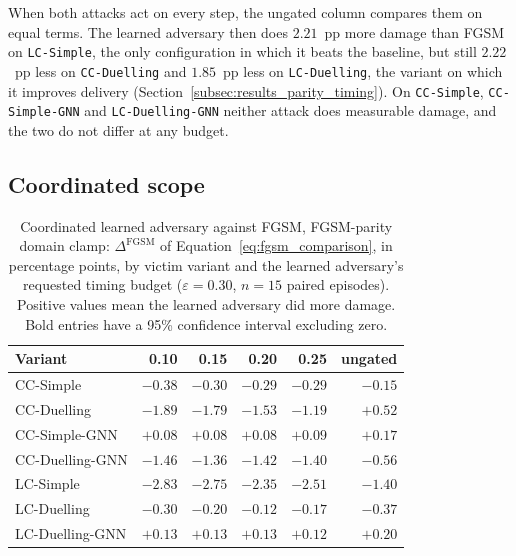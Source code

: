 When both attacks act on every step, the ungated column compares them on equal terms.
The learned adversary then does $2.21$~pp more damage than FGSM on \texttt{LC-Simple},
the only configuration in which it beats the baseline, but still $2.22$~pp less on
\texttt{CC-Duelling} and $1.85$~pp less on \texttt{LC-Duelling}, the variant on which it
improves delivery (Section~\ref{subsec:results_parity_timing}). On \texttt{CC-Simple},
\texttt{CC-Simple-GNN} and \texttt{LC-Duelling-GNN} neither attack does measurable damage,
and the two do not differ at any budget.

\subsection{Coordinated scope}
\label{subsec:results_fgsm_coordinated}

\begin{table}[htbp]
  \centering
  \caption{Coordinated learned adversary against FGSM, FGSM-parity domain clamp:
           $\Delta^{\text{FGSM}}$ of Equation~\eqref{eq:fgsm_comparison}, in percentage
           points, by victim variant and the learned adversary's requested timing budget
           ($\varepsilon = 0.30$, $n = 15$ paired episodes). Positive values mean the
           learned adversary did more damage. Bold entries have a 95\% confidence
           interval excluding zero.}
  \label{tab:fgsm_vs_coordinated}
  \begin{tabular}{lrrrrr}
    \hline
    \textbf{Variant} & \textbf{0.10} & \textbf{0.15} & \textbf{0.20} & \textbf{0.25} & \textbf{ungated} \\
    \hline
    CC-Simple        & $-0.38$ & $-0.30$ & $-0.29$ & $-0.29$ & $-0.15$ \\
    CC-Duelling      & $\mathbf{-1.89}$ & $\mathbf{-1.79}$ & $-1.53$ & $-1.19$ & $+0.52$ \\
    CC-Simple-GNN    & $+0.08$ & $+0.08$ & $+0.08$ & $+0.09$ & $+0.17$ \\
    CC-Duelling-GNN  & $\mathbf{-1.46}$ & $-1.36$ & $\mathbf{-1.42}$ & $\mathbf{-1.40}$ & $-0.56$ \\
    LC-Simple        & $\mathbf{-2.83}$ & $\mathbf{-2.75}$ & $\mathbf{-2.35}$ & $\mathbf{-2.51}$ & $-1.40$ \\
    LC-Duelling      & $-0.30$ & $-0.20$ & $-0.12$ & $-0.17$ & $-0.37$ \\
    LC-Duelling-GNN  & $+0.13$ & $+0.13$ & $+0.13$ & $+0.12$ & $+0.20$ \\
    \hline
  \end{tabular}
\end{table}

